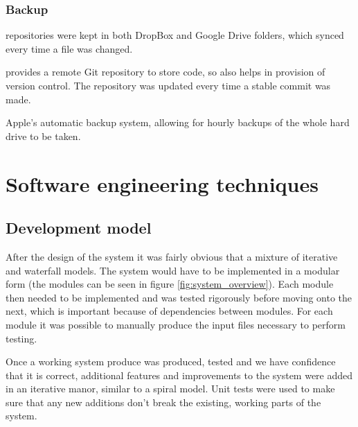 \documentclass[12pt,twoside,notitlepage]{report}
\begin{document}
        \subsubsection{Backup}
            \begin{description}[font=\normalfont\itshape, labelindent=10pt]
                \item[DropBox and Google Drive:] repositories were kept in both DropBox and Google Drive folders, which 
                    synced every time a file was changed.
                \item[Github:] provides a remote Git repository to store code, so also helps in provision of version 
                    control. The repository was updated every time a stable commit was made.
                \item[Time machine:] Apple's automatic backup system, allowing for hourly backups of the whole hard drive 
                    to be taken.
            \end{description}



    \section{Software engineering techniques}
        \subsection{Development model}
            After the design of the system it was fairly obvious that a mixture of iterative and waterfall models. 
            The system would have to be implemented in a modular form (the modules can be seen in figure 
            \ref{fig:system_overview}). Each module then needed to be implemented and was tested rigorously before 
            moving onto the next, which is important because of dependencies between modules. For each module it was 
            possible to manually produce the input files necessary to perform testing.

            Once a working system produce was produced, tested and we have confidence that it is correct, additional 
            features and improvements to the system were added in an iterative manor, similar to a spiral model. Unit 
            tests were used to make sure that any new additions don't break the existing, working parts of the system.
\end{document}
